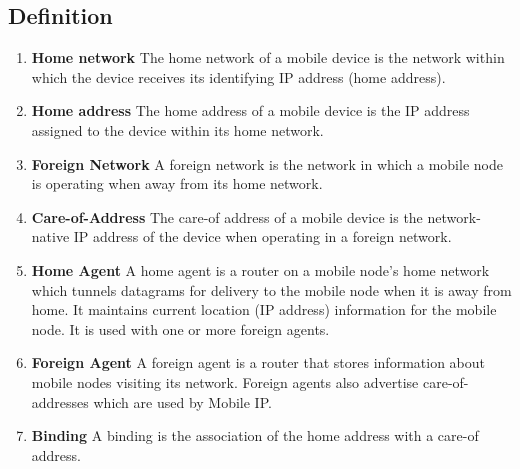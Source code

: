 \documentclass[12pt]{book}
\begin{document}
\subsection{Definition}
\begin{enumerate}
    \item \textbf{Home network} The home network of a mobile device is the network within which the device receives its identifying IP address (home address).
    \item \textbf{Home address} The home address of a mobile device is the IP address assigned to the device within its home network.
    \item \textbf{Foreign Network} A foreign network is the network in which a mobile node is operating when away from its home network.
    \item \textbf{Care-of-Address} The care-of address of a mobile device is the network-native IP address of the device when operating in a foreign network.
    \item \textbf{Home Agent} A home agent is a router on a mobile node’s home network which tunnels datagrams for delivery to the mobile node when it is away from home. It maintains current location (IP address) information for the mobile node. It is used with one or more foreign agents.
    \item \textbf{Foreign Agent} A foreign agent is a router that stores information about mobile nodes visiting its network. Foreign agents also advertise care-of-addresses which are used by Mobile IP.
    \item \textbf{Binding} A binding is the association of the home address with a care-of address.
\end{enumerate}
\end{document}

